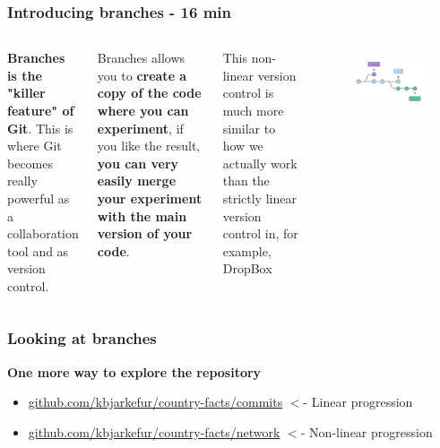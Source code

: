 \documentclass[aspectratio=169]{beamer} %
\newcommand{\trainingURL}[1]{{\color{blue}\url{#1}}}
\newcommand{\traininerUsername}{kbjarkefur}
\newcommand{\repoName}{\traininerUsername/country-facts}
\newcommand{\trainingRepoURL}[1]{\trainingURL{github.com/\repoName #1}}
\begin{document}
\begin{frame}
	\frametitle{Introducing branches  - 16 min}

	\begin{columns}[c] 
		
		\textbf{Branches is the "killer feature" of Git}. This is where Git becomes really powerful as a collaboration tool and as version control.
		
		\vspace{.25cm}
	
		Branches allows you to \textbf{create a copy of the code where you can experiment}, if you like the result, \textbf{you can very easily merge your experiment with the main version of your code}.
		
		\vspace{.25cm}
		
		This non-linear version control is much more similar to how we actually work than the strictly linear version control in, for example, DropBox
		
		\begin{figure}
			\centering
			\includegraphics[width=1\linewidth]{../../Common-Resources/img/branches}
			\label{fig:branches}
		\end{figure}
		
	\end{columns}
\end{frame}

\begin{frame}
	\frametitle{Looking at branches}

	\textbf{One more way to explore the repository}
	\begin{itemize}
		\item \trainingRepoURL{/commits} $<$- Linear progression
		\item \trainingRepoURL{/network} $<$- Non-linear progression
	\end{itemize}
\end{frame}
\end{document}
